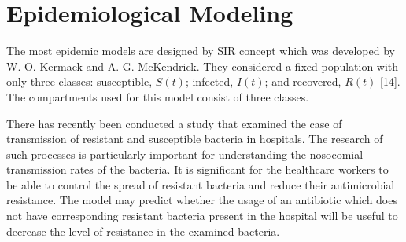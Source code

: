 \chapter*{Epidemiological Modeling}


The most epidemic models are designed by SIR concept which was developed by W. O. Kermack and A. G. McKendrick. They considered a fixed population with only three classes: susceptible, $S(t)$; infected, $I(t)$; and recovered, $R(t)$ [14]. The compartments used for this model consist of three classes.

There has recently been conducted a study that examined the case of transmission of resistant and susceptible bacteria in hospitals. The research of such processes is particularly important for understanding the nosocomial transmission rates of the bacteria. It is significant for the healthcare workers to be able to control the spread of resistant bacteria and reduce their antimicrobial resistance. The model may predict whether the usage of an antibiotic which does not have corresponding resistant bacteria present in the hospital will be useful to decrease the level of resistance in the examined bacteria.
